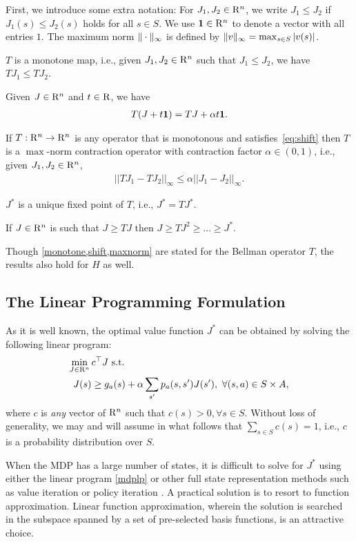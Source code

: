 First, we introduce some extra notation:
For $J_1,J_2\in \mathrm{R}^n$, we write $J_1\le J_2$ if $J_1(s)\le J_2(s)$ holds for all $s\in S$.
We use $\mathbf{1} \in \mathrm{R}^n$ to denote a vector with all entries $1$.
The maximum norm $\|\cdot\|_{\infty}$ is defined by $ \|v\|_{\infty} = \max_{s\in S} |v(s)|$.
\begin{lemma}\label{monotone}
$T$ is a monotone map, i.e., given $J_1,J_2 \in \mathrm{R}^n$ such that $J_1\leq J_2$, we have $T J_1\leq T J_2$. 
\end{lemma}
\begin{lemma}\label{shift}
Given $J\in \mathrm{R}^n$ and $t \in \mathrm{R}$, we have
\begin{align}\label{eq:shift}
T(J+t\one)=TJ+\alpha t\one.
\end{align}
\end{lemma}
\begin{lemma}\label{maxnorm}
If $T: \mathrm{R}^n \to \mathrm{R}^n$ is any operator that is monotonous and satisfies~\eqref{eq:shift} then 
$T$ is a $\max$-norm contraction operator with contraction factor $\alpha \in (0,1)$, i.e., given $J_1, J_2 \in \mathrm{R}^n$,
\begin{align}
||TJ_1-TJ_2||_\infty\leq \alpha ||J_1-J_2||_\infty.
\end{align}
\end{lemma}
\begin{lemma}\label{uniquesol} 
$J^*$ is a unique fixed point of $T$, i.e., $J^*=TJ^*$.
\end{lemma}
\begin{corollary}
If $J\in \mathrm{R}^n$ is such that $J\geq TJ$ then $J\geq TJ^2\geq \ldots \geq J^*$.
\end{corollary}
Though  \cref{monotone,shift,maxnorm} are stated for the Bellman operator $T$, the results also hold for $H$ as well.

\subsection{The Linear Programming Formulation}
As it is well known, the optimal value function $J^*$ can be obtained by solving the following linear program:
\begin{align}\label{mdplp}
\min_{J\in \R^n}\, &c^\top J\,\,\text{s.t.}\\
 J(s)&\geq g_a(s)+\alpha\sum_{s'}p_a(s,s')J(s'),\,\,
\forall (s,a)\in S\times A,
\end{align}
where $c$ is \emph{any} vector of $\mathrm{R}^n$ such that $c(s)>0, \forall s \in S$. Without loss of generality, we may and will assume in what follows that $\sum_{s\in S}c(s)=1$, i.e., $c$ is a probability distribution over $S$.

When the MDP has a large number of states, it is difficult to solve for $J^*$ using either the linear program \eqref{mdplp} or other full state representation methods such as value iteration or policy iteration \cite{BertB}. A practical solution is to resort to function approximation. Linear function approximation, wherein the solution is searched in the subspace spanned by a set of pre-selected basis functions, is an attractive choice.
